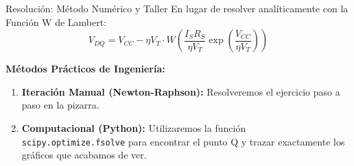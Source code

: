 \documentclass[10pt, aspectratio=169]{beamer}
\begin{document}
\begin{frame}{Resolución: Método Numérico y Taller}
  En lugar de resolver analíticamente con la Función W de Lambert:
  \begin{equation*}
      V_{DQ} = V_{CC} - \eta V_T \cdot W \left( \frac{I_S R_S}{\eta V_T} \exp\left(\frac{V_{CC}}{\eta V_T}\right) \right)
  \end{equation*}
  
  \vspace{0.3cm}
  \textbf{Métodos Prácticos de Ingeniería:}
  \begin{enumerate}
      \item \textbf{Iteración Manual (Newton-Raphson):} Resolveremos el ejercicio paso a paso en la pizarra.
      \item \textbf{Computacional (Python):} Utilizaremos la función \texttt{scipy.optimize.fsolve} para encontrar el punto Q y trazar exactamente los gráficos que acabamos de ver.
  \end{enumerate}
\end{frame}
\end{document}

